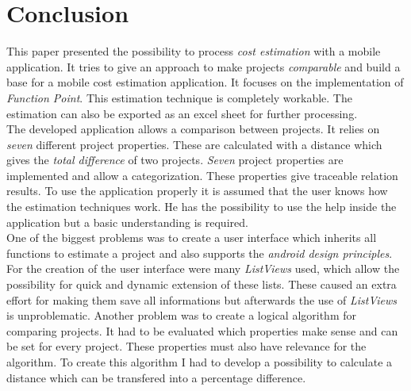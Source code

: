 \chapter{Conclusion}\label{conclusion}

This paper presented the possibility to process \textit{cost estimation} with a mobile application. It tries to give an approach to make projects \textit{comparable} and build a base for a mobile cost estimation application. It focuses on the implementation of \textit{Function Point}. This estimation technique is completely workable. The estimation can also be exported as an excel sheet for further processing.\\
The developed application allows a comparison between projects. It relies on \textit{seven} different project properties. These are calculated with a distance which gives the \textit{total difference} of two projects. \textit{Seven} project properties are implemented and allow a categorization. These properties give traceable relation results. To use the application properly it is assumed that the user knows how the estimation techniques work. He has the possibility to use the help inside the application but a basic understanding is required.\\
One of the biggest problems was to create a user interface which inherits all functions to estimate a project and also supports the \textit{android design principles}. For the creation of the user interface were many \textit{ListViews} used, which allow the possibility for quick and dynamic extension of these lists. These caused an extra effort for making them save all informations but afterwards the use of \textit{ListViews} is unproblematic. Another problem was to create a logical algorithm for comparing projects. It had to be evaluated which properties make sense and can be set for every project. These properties must also have relevance for the algorithm. To create this algorithm I had to develop a possibility to calculate a distance which can be transfered into a percentage difference. \\
